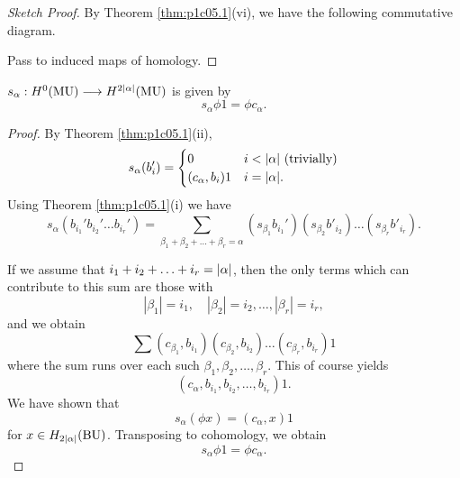 \documentclass[../main]{subfiles}
\begin{document}
\begin{proof}[Sketch Proof]
By Theorem \ref{thm:p1c05.1}(vi), we have the following commutative diagram.

\begin{center}
\end{center}

Pass to induced maps of homology.
\end{proof} 

\begin{corollary}
\label{cor:p1c05.3}
$s_\alpha : H^0(\operatorname{MU}) \longrightarrow H^{2\lvert\alpha\rvert} (\operatorname{MU})$ is given by \[s_\alpha \phi 1 = \phi c_\alpha.\]
\end{corollary}

\begin{proof}
By Theorem \ref{thm:p1c05.1}(ii), \[s_\alpha(b_i') = \begin{cases}0 & i < \lvert\alpha\rvert \text { (trivially)} \\ (c_\alpha, b_i) 1 & i = \lvert\alpha\rvert.\end{cases}\] Using Theorem \ref{thm:p1c05.1}(i) we have \[s_\alpha (b_{i_1}' b_{i_2}' \ldots b_{i_r}') = \sum_{\beta_1 + \beta_2 + \ldots + \beta_r = \alpha} (s_{\beta_1} b_{i_1}') (s_{\beta_2} b'_{i_2}) \ldots (s_{\beta_r} b'_{i_r}).\]

If we assume that $i_1 + i_2 + \ldots + i_r = \lvert\alpha\rvert$, then the only terms which can contribute to this sum are those with \[|\beta_1| = i_1, \quad |\beta_2| = i_2, \ldots, |\beta_r| = i_r,\] and we obtain \[\sum (c_{\beta_1}, b_{i_1}) (c_{\beta_2}, b_{i_2}) \ldots (c_{\beta_r}, b_{i_r}) 1\] where the sum runs over each such $\beta_1, \beta_2, \ldots, \beta_r$. This of course yields \[(c_\alpha, b_{i_1}, b_{i_2}, \ldots, b_{i_r}) 1.\] We have shown that \[s_\alpha(\phi x) = (c_\alpha, x) 1\] for $x \in H_{2\lvert\alpha\rvert} (\operatorname{BU})$. Transposing to cohomology, we obtain \[s_\alpha \phi 1 = \phi c_\alpha.\]
\end{proof}
\end{document}
